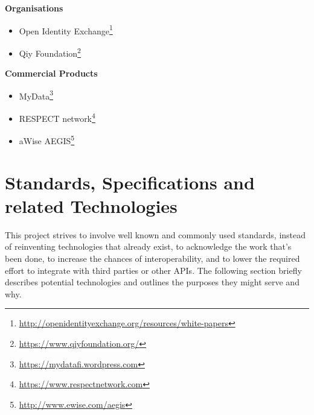 \documentclass[12pt,english,a4paper,titlepage,cleardoublepage=empty,dottedtoc]{report}
\renewcommand{\href}[2]{#2\footnote{\url{#1}}}
\providecommand{\tightlist}{%
  \setlength{\itemsep}{0pt}\setlength{\parskip}{0pt}}
\begin{document}
\textbf{Organisations}

\begin{itemize}
\tightlist
\item
  \href{http://openidentityexchange.org/resources/white-papers}{Open
  Identity Exchange}
\item
  \href{https://www.qiyfoundation.org/}{Qiy Foundation}
\end{itemize}

\textbf{Commercial Products}

\begin{itemize}
\tightlist
\item
  \href{https://mydatafi.wordpress.com}{MyData}
\item
  \href{https://www.respectnetwork.com}{RESPECT network}
\item
  \href{http://www.ewise.com/aegis}{aWise AEGIS}
\end{itemize}

\newpage

\hypertarget{standards-specifications-and-related-technologies}{\section{Standards,
Specifications and related
Technologies}\label{standards-specifications-and-related-technologies}}

This project strives to involve well known and commonly used standards,
instead of reinventing technologies that already exist, to acknowledge
the work that's been done, to increase the chances of interoperability,
and to lower the required effort to integrate with third parties or
other APIs. The following section briefly describes potential
technologies and outlines the purposes they might serve and why.
\end{document}
